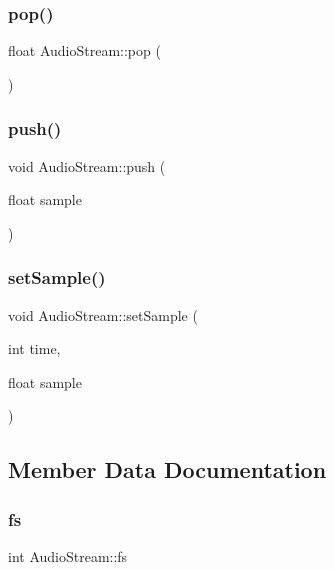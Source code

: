\mbox{\label{class_audio_stream_ab425433b7209483b2fb6c347a78483b5}} 
\subsubsection{pop()}
{\footnotesize\ttfamily float Audio\+Stream\+::pop (\begin{DoxyParamCaption}{ }\end{DoxyParamCaption})}

\mbox{\label{class_audio_stream_ab2ceba569c33b8b5babc7294a2a42a83}} 
\subsubsection{push()}
{\footnotesize\ttfamily void Audio\+Stream\+::push (\begin{DoxyParamCaption}\item[{float}]{sample }\end{DoxyParamCaption})}

\mbox{\label{class_audio_stream_a5ac03049345307942841bdfcdb75a7e8}} 
\subsubsection{set\+Sample()}
{\footnotesize\ttfamily void Audio\+Stream\+::set\+Sample (\begin{DoxyParamCaption}\item[{int}]{time,  }\item[{float}]{sample }\end{DoxyParamCaption})}



\subsection{Member Data Documentation}
\mbox{\label{class_audio_stream_ace8ac0e7fbaa176c74804b7133c03f45}} 
\subsubsection{fs}
{\footnotesize\ttfamily int Audio\+Stream\+::fs}

